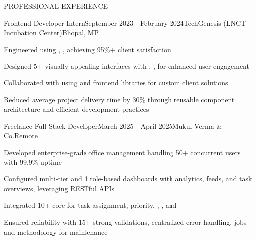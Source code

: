 \documentclass{resume}
\begin{document}
\begin{rSection}{PROFESSIONAL EXPERIENCE}

\begin{rExperience}{Frontend Developer Intern}{September 2023 - February 2024}{TechGenesis (LNCT Incubation Center)}{Bhopal, MP}
\item Engineered  using , ,  achieving 95\%+ client satisfaction
\item Designed 5+ visually appealing interfaces with , ,  for enhanced user engagement
\item Collaborated with  using  and frontend libraries for custom client solutions
\item Reduced average project delivery time by 30\% through reusable component architecture and efficient development practices
\end{rExperience}

\begin{rExperience}{Freelance Full Stack Developer}{March 2025 - April 2025}{Mukul Verma \& Co.}{Remote}
\item Developed enterprise-grade office management  handling 50+ concurrent users with 99.9\% uptime
\item Configured multi-tier  and 4 role-based dashboards with analytics, feeds, and task overviews, leveraging RESTful APIs
\item Integrated 10+ core  for task assignment, priority, , , and 
\item Ensured reliability with 15+ strong validations, centralized error handling,  jobs and  methodology for maintenance
\end{rExperience}

\end{rSection}
\end{document}
